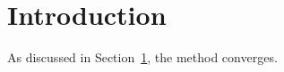 \documentclass{article}
\begin{document}
\section{Introduction}\label{sec:intro}
As discussed in Section~\ref{sec:intro}, the method converges.
\end{document}

